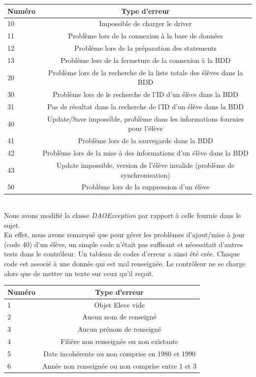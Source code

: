 \documentclass[a4paper,12pt]{article}
\begin{document}
\begin{tabular}{|l|c|}
  \hline
  Numéro & Type d'erreur \\
  \hline
	10 & Impossible de charger le driver \\
	11 & Problème lors de la connexion à la base de données \\
	12 & Problème lors de la préparation des statements \\
 	13 & Problème lors de la fermeture de la connexion à la BDD \\
	20 & Problème lors de la recherche de la liste totale des élèves dans la BDD \\
	30 & Problème lors de le recherche de l'ID d'un élève dans la BDD\\
	31 & Pas de résultat dans la recherche de l'ID d'un élève dans la BDD \\
	40 & Update/Save impossible, problème dans les informations fournies pour l'élève \\
	41 & Problème lors de la sauvegarde dans la BDD \\
	42 & Problème lors de la mise à des informations d'un élève dans la BDD\\
	43 & Update impossible, version de l'élève invalide (problème de synchronisation)\\
	50 & Problème lors de la suppression d'un élève \\
  \hline
\end{tabular}
~\\

Nous avons modifié la classe \textit{DAOException} par rapport à celle fournie dans le sujet.\\
En effet, nous avons remarqué que pour gérer les problèmes d'ajout/mise à jour (code 40) d'un élève,
un simple code n'était pas suffisant et nécessitait d'autres tests dans le contrôleur. Un tableau de codes
d'erreur a ainsi été crée. Chaque code est associé à une donnée qui est mal renseignée. Le contrôleur ne se charge
alors que de \og mettre un texte \fg sur ceux qu'il reçoit.\\

\begin{center}
\begin{tabular}{|l|c|}
  \hline
Numéro & Type d'erreur \\
  \hline
	1 & Objet Eleve vide \\
	2 & Aucun nom de renseigné \\
	3 & Aucun prénom de renseigné \\
	4 & Filière non renseignée ou non existante \\
	5 & Date incohérente ou non comprise en 1980 et 1990\\
	6 & Année non renseignée ou non comprise entre 1 et 3 \\
  \hline
\end{tabular}
\end{center}
\end{document}
